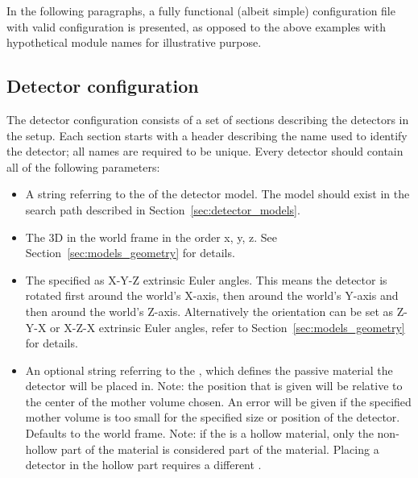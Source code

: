 In the following paragraphs, a fully functional (albeit simple) configuration file with valid configuration is presented, as opposed to the above examples with hypothetical module names for illustrative purpose.

\subsection{Detector configuration}
\label{sec:detector_config}
The detector configuration consists of a set of sections describing the detectors in the setup.
Each section starts with a header describing the name used to identify the detector; all names are required to be unique.
Every detector should contain all of the following parameters:
\begin{itemize}
\item A string referring to the  of the detector model.
The model should exist in the search path described in Section~\ref{sec:detector_models}.
\item The 3D  in the world frame in the order x, y, z.
See Section~\ref{sec:models_geometry} for details.
\item The  specified as X-Y-Z extrinsic Euler angles.
This means the detector is rotated first around the world's X-axis, then around the world's Y-axis and then around the world's Z-axis.
Alternatively the orientation can be set as Z-Y-X or X-Z-X extrinsic Euler angles, refer to Section~\ref{sec:models_geometry} for details.
\item An optional string referring to the , which defines the passive material the detector will be placed in.
  Note: the position that is given will be relative to the center of the mother volume chosen. An error will be given if the specified mother volume is too small for the specified size or position of the detector. Defaults to the world frame.
  Note: if the  is a hollow material, only the non-hollow part of the material is considered part of the material. Placing a detector in the hollow part requires a different .
\end{itemize}

